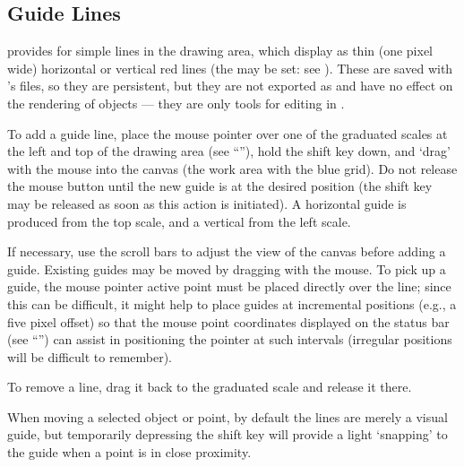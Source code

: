 		\subsection{Guide Lines}%
		\label{ssec:guide_lines}
		\IXpkgu{} provides for simple  lines
		in the drawing area, which display as thin
		(one pixel wide) horizontal or vertical
		red lines (the  may be set:
		see ).
		These are saved with \IXpkg{}'s
		files, so they are persistent, but they are
		not exported as  and have no effect
		on the rendering of objects --- they are only
		tools for editing in \IXpkg{}.
		
		To add a guide line, place the mouse pointer
		over one of the graduated scales at the left
		and top of the drawing area
		(see ``''),
		hold the shift key
		down, and `drag' with the mouse into the canvas
		(the work area with the blue grid). Do not release
		the mouse button until the new guide is at the
		desired position (the shift key may be released
		as soon as this action is initiated). A horizontal
		guide is produced from the top scale, and a vertical
		 from the left scale.
		
		If necessary, use the scroll bars to adjust the
		view of the canvas before adding a guide. Existing guides
		may be moved by dragging with the mouse. To
		pick up a guide, the mouse pointer active point
		must be placed directly over the line; since this
		can be difficult, it might help to place guides
		at incremental positions (e.g., a five pixel offset)
		so that the mouse point coordinates displayed on the
		status bar (see ``'')
		can assist in positioning the pointer at such
		intervals (irregular positions will be difficult
		to remember).
		
		To remove a  line, drag it back to the
		graduated scale and release it there.
		
		When moving a selected object or point, by default
		the  lines are merely a visual guide,
		but temporarily depressing the shift key will
		provide a light `snapping' to the guide when a
		point is in close proximity.

















